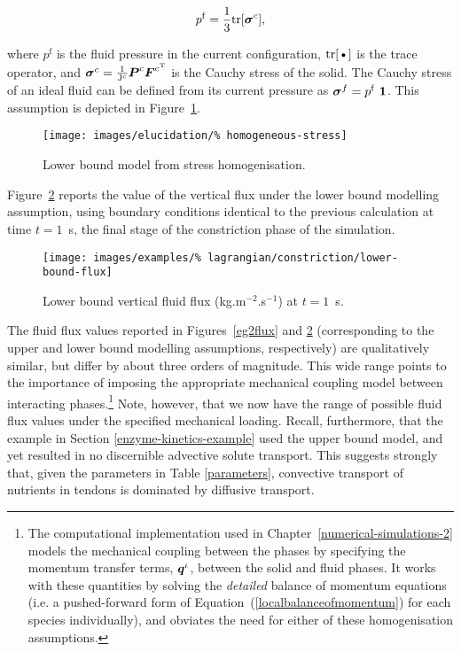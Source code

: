 \begin{equation}
p^{\mathrm{f}} = \frac{1}{3} \mathrm{tr}[\mbox{\boldmath$\sigma$}^{c}],
\label{equalpr}
\end{equation}

\noindent where $p^{\mathrm{f}}$ is the fluid pressure in the current
configuration, $\mbox{tr[\textbullet]}$ is the trace operator, and
$\mbox{\boldmath$\sigma$}^{c}=\frac{1}{\mathrm{J^{c}}} \mbox{\boldmath$ P$}^{\mathrm{c}} \mbox{\boldmath$ F$}^{\mathrm{c}
  ^ {\mathrm{T}}}$ is the Cauchy stress of the solid. The Cauchy
stress of an ideal fluid can be defined from its current pressure as
\mbox{$\mbox{\boldmath$\sigma$}^{f}= p^{\mathrm{f}}\ {\bf 1}$.} This assumption is
depicted in Figure~\ref{lower-bound-model}.

\begin{figure}[ht]
  \centering
  \texttt{[image: images/elucidation/\%
    homogeneous-stress]}
  \caption{Lower bound model from stress homogenisation.}
  \label{lower-bound-model}
\end{figure}

Figure~{\ref{lowerbound}} reports the value of the vertical flux under
the lower bound modelling assumption, using boundary conditions
identical to the previous calculation at time $t=1$~s, the final stage
of the constriction phase of the simulation.

\begin{figure}[!hpt]
  \centering
  \texttt{[image: images/examples/\%
    lagrangian/constriction/lower-bound-flux]}
  \caption{Lower bound vertical fluid flux (kg.m$^{-2}$.s$^{-1}$) at
    $t=1$~s.}
  \label{lowerbound}
\end{figure}

The fluid flux values reported in Figures~\ref{eg2flux} and
\ref{lowerbound} (corresponding to the upper and lower bound modelling
assumptions, respectively) are qualitatively similar, but differ by
about three orders of magnitude. This wide range points to the
importance of imposing the appropriate mechanical coupling model
between interacting phases.\footnote{The computational implementation
  used in Chapter~\ref{numerical-simulations-2} models the mechanical
  coupling between the phases by specifying the momentum transfer
  terms, $\mbox{\boldmath$ q$}^{\iota}$, between the solid and fluid phases. It works
  with these quantities by solving the {\em detailed} balance of
  momentum equations (i.e. a pushed-forward form of
  Equation~(\ref{localbalanceofmomentum}) for each species
  individually), and obviates the need for either of these
  homogenisation assumptions.}  Note, however, that we now have the
range of possible fluid flux values under the specified mechanical
loading. Recall, furthermore, that the example in Section
\ref{enzyme-kinetics-example} used the upper bound model, and yet
resulted in no discernible advective solute transport. This suggests
strongly that, given the parameters in Table \ref{parameters},
convective transport of nutrients in tendons is dominated by diffusive
transport.

